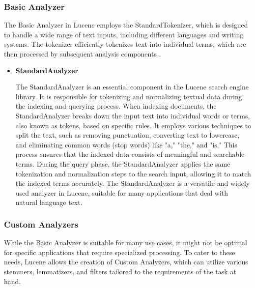 \subsubsection{Basic Analyzer}
The Basic Analyzer in Lucene employs the StandardTokenizer, which is designed to handle a wide range of text inputs, including different languages and writing systems. The tokenizer efficiently tokenizes text into individual terms, which are then processed by subsequent analysis components \cite{gospodnetic2021lucene}.
\begin{itemize}
    \item \textbf{StandardAnalyzer}

    The StandardAnalyzer is an essential component in the Lucene search engine library. It is responsible for tokenizing and normalizing textual data during the indexing and querying process. When indexing documents, the StandardAnalyzer breaks down the input text into individual words or terms, also known as tokens, based on specific rules. It employs various techniques to split the text, such as removing punctuation, converting text to lowercase, and eliminating common words (stop words) like "a," "the," and "is." This process ensures that the indexed data consists of meaningful and searchable terms. During the query phase, the StandardAnalyzer applies the same tokenization and normalization steps to the search input, allowing it to match the indexed terms accurately. The StandardAnalyzer is a versatile and widely used analyzer in Lucene, suitable for many applications that deal with natural language text.
\end{itemize}

\subsubsection{Custom Analyzers}
While the Basic Analyzer is suitable for many use cases, it might not be optimal for specific applications that require specialized processing. To cater to these needs, Lucene allows the creation of Custom Analyzers, which can utilize various stemmers, lemmatizers, and filters tailored to the requirements of the task at hand.

